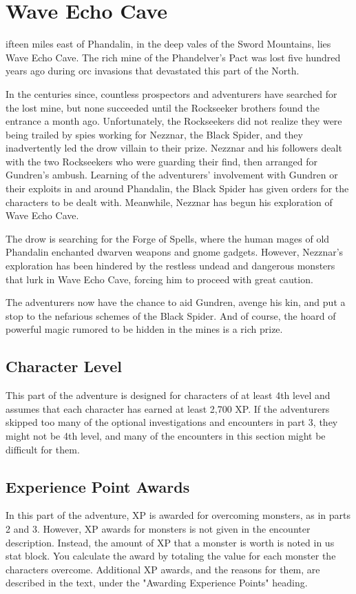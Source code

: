 \documentclass[10pt,a4paper,twoside,bg=print,twocolumn,openany,nodeprecatedcode]{dndbook}
\begin{document}
\chapter{Wave Echo Cave}
ifteen miles east of Phandalin, in the deep vales of the Sword Mountains, lies Wave Echo Cave. The rich mine of the Phandelver's Pact was lost five hundred years ago during orc invasions that devastated this part of the North.


In the centuries since, countless prospectors and adventurers have searched for the lost mine, but none succeeded until the Rockseeker brothers found the entrance a month ago. Unfortunately, the Rockseekers did not realize they were being trailed by spies working for Nezznar, the Black Spider, and they inadvertently led the drow villain to their prize. Nezznar and his followers dealt with the two Rockseekers who were guarding their find, then arranged for Gundren's ambush. Learning of the adventurers' involvement with Gundren or their exploits in and around Phandalin, the Black Spider has given orders for the characters to be dealt with. Meanwhile, Nezznar has begun his exploration of Wave Echo Cave.

The drow is searching for the Forge of Spells, where the human mages of old Phandalin enchanted dwarven weapons and gnome gadgets. However, Nezznar's exploration has been hindered by the restless undead and dangerous monsters that lurk in Wave Echo Cave, forcing him to proceed with great caution.

The adventurers now have the chance to aid Gundren, avenge his kin, and put a stop to the nefarious schemes of the Black Spider. And of course, the hoard of powerful magic rumored to be hidden in the mines is a rich prize.

\section{Character Level}
This part of the adventure is designed for characters of at least 4th level and assumes that each character has earned at least 2,700 XP. If the adventurers skipped too many of the optional investigations and encounters in part 3, they might not be 4th level, and many of the encounters in this section might be difficult for them.

\section{Experience Point Awards}
In this part of the adventure, XP is awarded for overcoming monsters, as in parts 2 and 3. However, XP awards for monsters is not given in the encounter description. Instead, the amount of XP that a monster is worth is noted in us stat block. You calculate the award by totaling the value for each monster the characters overcome. Additional XP awards, and the reasons for them, are described in the text, under the "Awarding Experience Points" heading.
\end{document}
